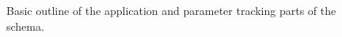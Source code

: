 \documentclass{cmspaper}
\begin{document}
{\begin{figure}[hbtp]
  \begin{center}
    \caption{Basic outline of the application and parameter tracking parts of the schema. }
    \label{fig:appl}
  \end{center}
\end{figure}





}
\end{document}
